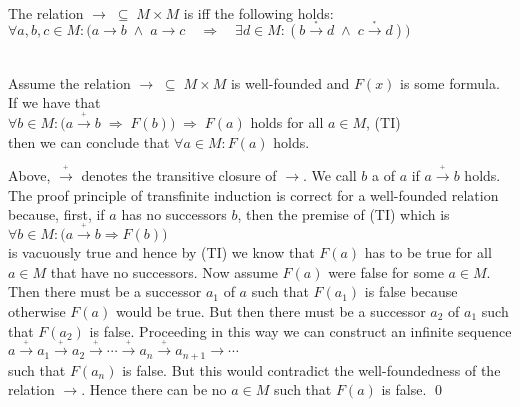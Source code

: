 \begin{Definition} \hspace*{\fill} \\
  The relation $\rightarrow \;\subseteq\; M \times M$ is  iff the following holds:
  \\[0.2cm]
  \hspace*{1.3cm}
  $\forall a, b, c \in M: \bigl(a \rightarrow b \;\wedge\; a \rightarrow c \quad\Rightarrow\quad
   \exists d \in M: (b \stackrel{_*}{\rightarrow} d \;\wedge\; c \stackrel{_*}{\rightarrow} d)\bigr)
  $  \eox
\end{Definition}
\pagebreak

\begin{Theorem}
  \hspace*{\fill} \\
  Assume the relation $\rightarrow \;\subseteq\; M \times M$ is well-founded and $F(x)$ is some formula.
  If we have that
  \\[0.2cm]
  \hspace*{1.3cm}
  $\forall b \in M: \bigl( a \stackrel{_+}{\rightarrow} b \;\Rightarrow\; F(b)\bigr) \;\Rightarrow\; F(a)$ holds for all $a \in M$, \hspace*{\fill} (TI)
  \\[0.2cm]
  then we can conclude that $\forall a \in M: F(a)$ holds.
\end{Theorem}

\proof
Above, $\stackrel{_+}{\rightarrow}$ denotes the transitive closure of $\rightarrow$.  We call $b$ a  of $a$
if $a \stackrel{_+}{\rightarrow} b$ holds.  The proof principle of transfinite induction is correct for a well-founded
relation because, first, if $a$ has no successors $b$, then the premise of (TI) which is
\\[0.2cm]
\hspace*{1.3cm}
$\forall b \in M: \bigl( a \stackrel{_+}{\rightarrow} b \Rightarrow F(b)\bigr)$
\\[0.2cm]
is vacuously true and hence by (TI) we know that $F(a)$ has to be true for all $a \in M$ that have no
successors.  Now assume $F(a)$ were false for some $a \in M$.  Then there must be a successor $a_1$ of $a$ such
that $F(a_1)$ is false because otherwise $F(a)$ would be true.  But then there must be a successor $a_2$ of
$a_1$ such that $F(a_2)$ is false.  Proceeding in this way we can construct an infinite sequence
\\[0.2cm]
\hspace*{1.3cm}
$a \stackrel{_+}{\rightarrow} a_1 \stackrel{_+}{\rightarrow} a_2 \stackrel{_+}{\rightarrow} \cdots \stackrel{_+}{\rightarrow} a_n \stackrel{_+}{\rightarrow} a_{n+1} \rightarrow
\cdots
$
\\[0.2cm]
such that $F(a_n)$ is false.  But this would contradict the well-foundedness of the relation $\rightarrow$.  Hence there can be no $a \in M$
such that $F(a)$ is false. \qed

